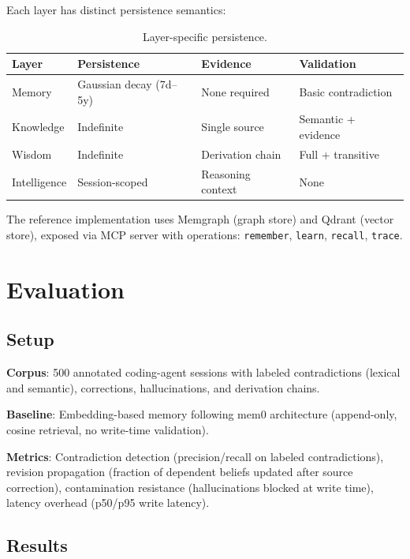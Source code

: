 \documentclass[11pt,letterpaper]{article}
\begin{document}
Each layer has distinct persistence semantics:

\begin{table}[H]
\centering
\caption{Layer-specific persistence.}
\label{tab:persistence}
\begin{tabular}{@{}llll@{}}
\toprule
\textbf{Layer} & \textbf{Persistence} & \textbf{Evidence} & \textbf{Validation} \\
\midrule
Memory & Gaussian decay (7d--5y) & None required & Basic contradiction \\
Knowledge & Indefinite & Single source & Semantic + evidence \\
Wisdom & Indefinite & Derivation chain & Full + transitive \\
Intelligence & Session-scoped & Reasoning context & None \\
\bottomrule
\end{tabular}
\end{table}

The reference implementation uses Memgraph (graph store) and Qdrant (vector store), exposed via MCP server with operations: \texttt{remember}, \texttt{learn}, \texttt{recall}, \texttt{trace}.

\section{Evaluation}
\label{sec:eval}

\subsection{Setup}

\textbf{Corpus}: 500 annotated coding-agent sessions with labeled contradictions (lexical and semantic), corrections, hallucinations, and derivation chains.

\textbf{Baseline}: Embedding-based memory following mem0 architecture (append-only, cosine retrieval, no write-time validation).

\textbf{Metrics}: Contradiction detection (precision/recall on labeled contradictions), revision propagation (fraction of dependent beliefs updated after source correction), contamination resistance (hallucinations blocked at write time), latency overhead (p50/p95 write latency).

\subsection{Results}
\end{document}

